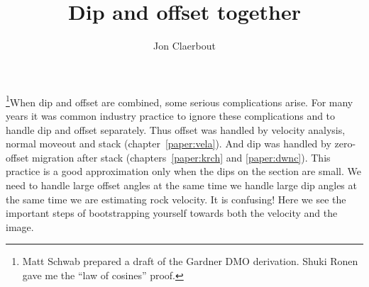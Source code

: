 \def\CAKEDIR{.}

\title{Dip and offset together}
\author{Jon Claerbout}
\maketitle
\label{paper:dpmv}

\def\vhalf{v_{\rm half}}

\par
\footnote{
	Matt Schwab prepared a draft of the Gardner DMO derivation.
	Shuki Ronen gave me the ``law of cosines'' proof.
	}When
dip and offset are combined,
some serious complications arise.
For many years it was common industry practice
to ignore these complications and to handle dip and offset separately.  
Thus offset was handled by velocity analysis, 
normal moveout and stack (chapter~\ref{paper:vela}).
And dip was handled by zero-offset 
migration after stack (chapters~\ref{paper:krch} and \ref{paper:dwnc}).
This practice is a good approximation only when
the dips on the section are small.
We need to handle large offset angles at the same
time we handle large dip angles
at the same time we are estimating rock velocity.
It is confusing!
Here we see the important steps
of bootstrapping yourself towards both the velocity and the image.


